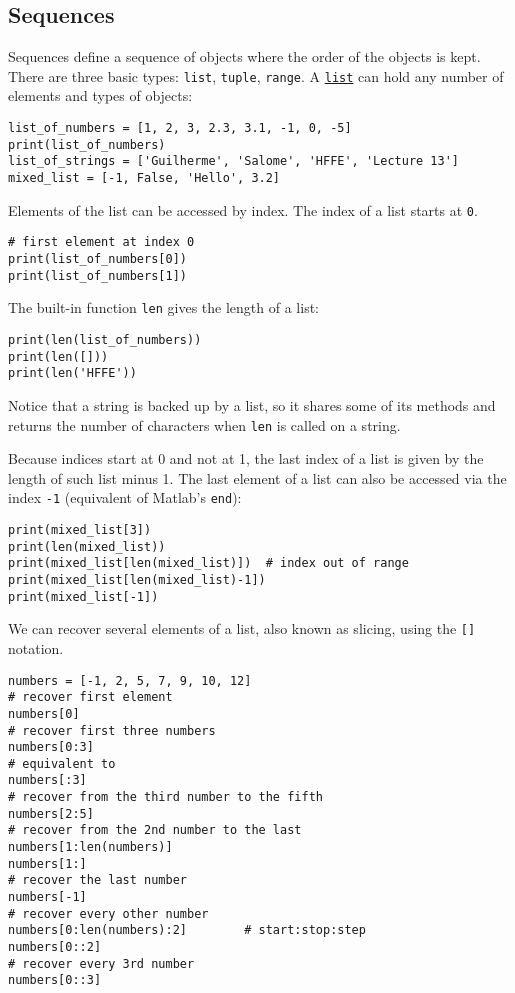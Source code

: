 \documentclass[12pt, a4paper]{article}
\begin{document}
\subsection{Sequences}
\label{sec:orgf3b7add}
Sequences define a sequence of objects where the order of the objects is kept.
There are three basic types: \texttt{list}, \texttt{tuple}, \texttt{range}.
A \href{https://docs.python.org/3.6/library/stdtypes.html\#list}{\texttt{list}} can hold any number of elements and types of objects:
\lstset{language=jupyter-python,label= ,caption= ,captionpos=b,numbers=none}
\begin{lstlisting}
list_of_numbers = [1, 2, 3, 2.3, 3.1, -1, 0, -5]
print(list_of_numbers)
list_of_strings = ['Guilherme', 'Salome', 'HFFE', 'Lecture 13']
mixed_list = [-1, False, 'Hello', 3.2]
\end{lstlisting}
Elements of the list can be accessed by index.
The index of a list starts at \texttt{0}.
\lstset{language=jupyter-python,label= ,caption= ,captionpos=b,numbers=none}
\begin{lstlisting}
# first element at index 0
print(list_of_numbers[0])
print(list_of_numbers[1])
\end{lstlisting}
The built-in function \texttt{len} gives the length of a list:
\lstset{language=jupyter-python,label= ,caption= ,captionpos=b,numbers=none}
\begin{lstlisting}
print(len(list_of_numbers))
print(len([]))
print(len('HFFE'))
\end{lstlisting}
Notice that a string is backed up by a list, so it shares some of its methods and returns the number of characters when \texttt{len} is called on a string.

Because indices start at 0 and not at 1, the last index of a list is given by the length of such list minus 1.
The last element of a list can also be accessed via the index \texttt{-1} (equivalent of Matlab's \texttt{end}):
\lstset{language=jupyter-python,label= ,caption= ,captionpos=b,numbers=none}
\begin{lstlisting}
print(mixed_list[3])
print(len(mixed_list))
print(mixed_list[len(mixed_list)])  # index out of range
print(mixed_list[len(mixed_list)-1])
print(mixed_list[-1])
\end{lstlisting}

We can recover several elements of a list, also known as slicing, using the \texttt{[]} notation.
\lstset{language=jupyter-python,label= ,caption= ,captionpos=b,numbers=none}
\begin{lstlisting}
numbers = [-1, 2, 5, 7, 9, 10, 12]
# recover first element
numbers[0]
# recover first three numbers
numbers[0:3]
# equivalent to
numbers[:3]
# recover from the third number to the fifth
numbers[2:5]
# recover from the 2nd number to the last
numbers[1:len(numbers)]
numbers[1:]
# recover the last number
numbers[-1]
# recover every other number
numbers[0:len(numbers):2]        # start:stop:step
numbers[0::2]
# recover every 3rd number
numbers[0::3]
\end{lstlisting}
\end{document}
